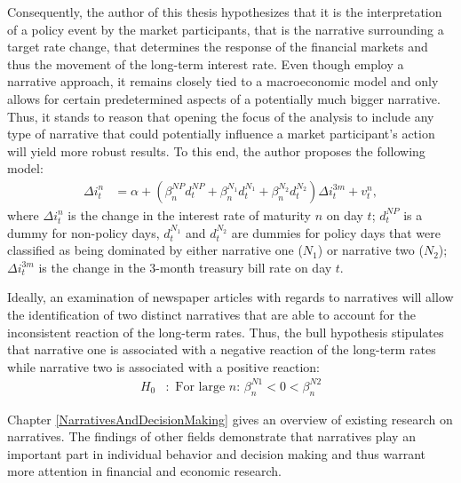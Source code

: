 \documentclass[11pt,a4paper,english,oneside]{book}
\numberwithin{equation}{chapter}
\begin{document}
Consequently, the author of this thesis hypothesizes that it is the interpretation of a policy event by the market participants, that is the narrative surrounding a target rate change, that determines the response of the financial markets and thus the movement of the long-term interest rate. Even though \cite{Ellingsen.2003} employ a narrative approach, it remains closely tied to a macroeconomic model and only allows for certain predetermined aspects of a potentially much bigger narrative. Thus, it stands to reason that opening the focus of the analysis to include any type of narrative that could potentially influence a market participant's action will yield more robust results. To this end, the author proposes the following model:
\begin{align}\label{reg2}
\Delta i^n_t &= \alpha + (\beta_n^{NP}d_t^{NP} + \beta_n^{N_1}d_t^{N_1} + \beta_n^{N_2}d_t^{N_2})\Delta i^{3m}_t + v_t^n,
\end{align}
where $\Delta i^n_t$ is the change in the interest rate of maturity $n$ on day $t$; $d_t^{NP}$ is a dummy for non-policy days, $d_t^{N_1}$ and $d_t^{N_2}$ are dummies for policy days that were classified as being dominated by either narrative one ($N_1$) or narrative two ($N_2$); $\Delta i^{3m}_t$ is the change in the 3-month treasury bill rate on day $t$.

Ideally, an examination of newspaper articles with regards to narratives will allow the identification of two distinct narratives that are able to account for the inconsistent reaction of the long-term rates. Thus, the bull hypothesis stipulates that narrative one is associated with a negative reaction of the long-term rates while narrative two is associated with a positive reaction:
\begin{align}\label{H00}
H_0&:  \text{ For large $n$: } \beta_n^{N1}<0< \beta_n^{N2}
\end{align}

Chapter \ref{NarrativesAndDecisionMaking} 
gives an overview of existing research on narratives. The findings of other fields demonstrate that narratives play an important part in individual behavior and decision making and thus warrant more attention in financial and economic research. 

\end{document}
